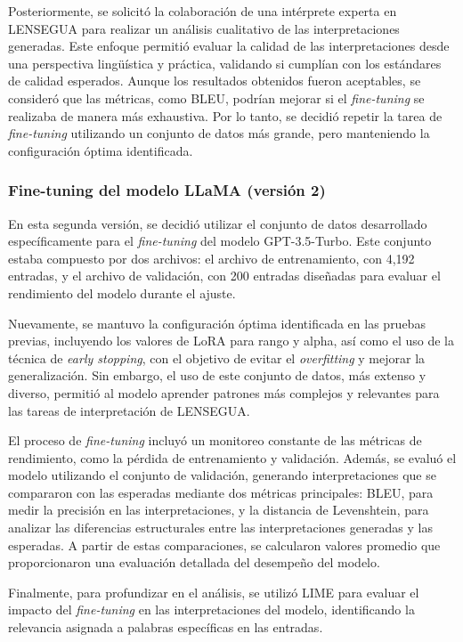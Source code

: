 Posteriormente, se solicitó la colaboración de una intérprete experta en LENSEGUA para realizar un análisis cualitativo de las interpretaciones generadas. Este enfoque permitió evaluar la calidad de las interpretaciones desde una perspectiva lingüística y práctica, validando si cumplían con los estándares de calidad esperados. Aunque los resultados obtenidos fueron aceptables, se consideró que las métricas, como BLEU, podrían mejorar si el \textit{fine-tuning} se realizaba de manera más exhaustiva. Por lo tanto, se decidió repetir la tarea de \textit{fine-tuning} utilizando un conjunto de datos más grande, pero manteniendo la configuración óptima identificada.

\subsubsection{Fine-tuning del modelo LLaMA (versión 2)}

En esta segunda versión, se decidió utilizar el conjunto de datos desarrollado específicamente para el \textit{fine-tuning} del modelo GPT-3.5-Turbo. Este conjunto estaba compuesto por dos archivos: el archivo de entrenamiento, con 4,192 entradas, y el archivo de validación, con 200 entradas diseñadas para evaluar el rendimiento del modelo durante el ajuste. 

Nuevamente, se mantuvo la configuración óptima identificada en las pruebas previas, incluyendo los valores de LoRA para rango y alpha, así como el uso de la técnica de \textit{early stopping}, con el objetivo de evitar el \textit{overfitting} y mejorar la generalización. Sin embargo, el uso de este conjunto de datos, más extenso y diverso, permitió al modelo aprender patrones más complejos y relevantes para las tareas de interpretación de LENSEGUA.

El proceso de \textit{fine-tuning} incluyó un monitoreo constante de las métricas de rendimiento, como la pérdida de entrenamiento y validación. Además, se evaluó el modelo utilizando el conjunto de validación, generando interpretaciones que se compararon con las esperadas mediante dos métricas principales: BLEU, para medir la precisión en las interpretaciones, y la distancia de Levenshtein, para analizar las diferencias estructurales entre las interpretaciones generadas y las esperadas. A partir de estas comparaciones, se calcularon valores promedio que proporcionaron una evaluación detallada del desempeño del modelo.

Finalmente, para profundizar en el análisis, se utilizó LIME para evaluar el impacto del \textit{fine-tuning} en las interpretaciones del modelo, identificando la relevancia asignada a palabras específicas en las entradas. 


